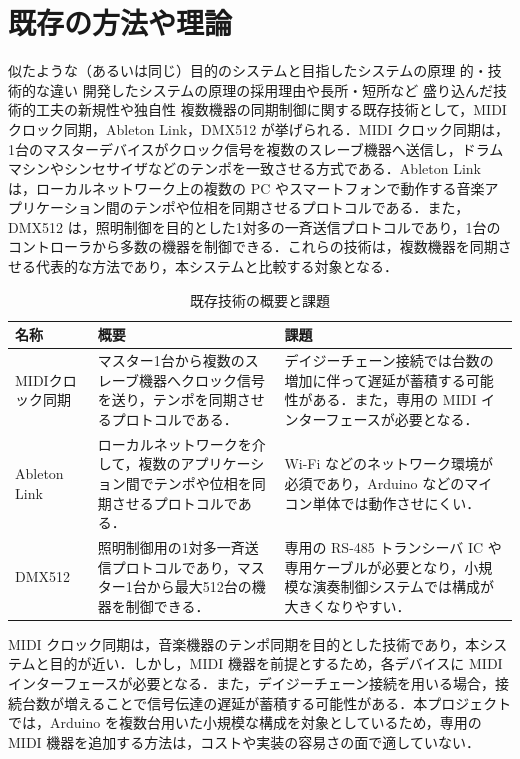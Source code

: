 \section{既存の方法や理論}
 似たような（あるいは同じ）目的のシステムと目指したシステムの原理
的・技術的な違い
 開発したシステムの原理の採用理由や長所・短所など
 盛り込んだ技術的工夫の新規性や独自性
\fi
複数機器の同期制御に関する既存技術として，MIDI クロック同期，Ableton Link，DMX512 が挙げられる．MIDI クロック同期は，1台のマスターデバイスがクロック信号を複数のスレーブ機器へ送信し，ドラムマシンやシンセサイザなどのテンポを一致させる方式である．Ableton Link は，ローカルネットワーク上の複数の PC やスマートフォンで動作する音楽アプリケーション間のテンポや位相を同期させるプロトコルである．また，DMX512 は，照明制御を目的とした1対多の一斉送信プロトコルであり，1台のコントローラから多数の機器を制御できる．これらの技術は，複数機器を同期させる代表的な方法であり，本システムと比較する対象となる．

\begin{table}[H]
\centering
\caption{既存技術の概要と課題}
\label{tab:1-1}
\begin{tabularx}{\linewidth}{|>{\centering\arraybackslash}p{3.0cm}|X|X|}
\hline
\textbf{名称} & \textbf{概要} & \textbf{課題} \\
\hline
MIDIクロック同期
&
マスター1台から複数のスレーブ機器へクロック信号を送り，テンポを同期させるプロトコルである．
&
デイジーチェーン接続では台数の増加に伴って遅延が蓄積する可能性がある．また，専用の MIDI インターフェースが必要となる．
\\
\hline
Ableton Link
&
ローカルネットワークを介して，複数のアプリケーション間でテンポや位相を同期させるプロトコルである．
&
Wi-Fi などのネットワーク環境が必須であり，Arduino などのマイコン単体では動作させにくい．
\\
\hline
DMX512
&
照明制御用の1対多一斉送信プロトコルであり，マスター1台から最大512台の機器を制御できる．
&
専用の RS-485 トランシーバ IC や専用ケーブルが必要となり，小規模な演奏制御システムでは構成が大きくなりやすい．
\\
\hline
\end{tabularx}
\end{table}

MIDI クロック同期は，音楽機器のテンポ同期を目的とした技術であり，本システムと目的が近い．しかし，MIDI 機器を前提とするため，各デバイスに MIDI インターフェースが必要となる．また，デイジーチェーン接続を用いる場合，接続台数が増えることで信号伝達の遅延が蓄積する可能性がある．本プロジェクトでは，Arduino を複数台用いた小規模な構成を対象としているため，専用の MIDI 機器を追加する方法は，コストや実装の容易さの面で適していない．

